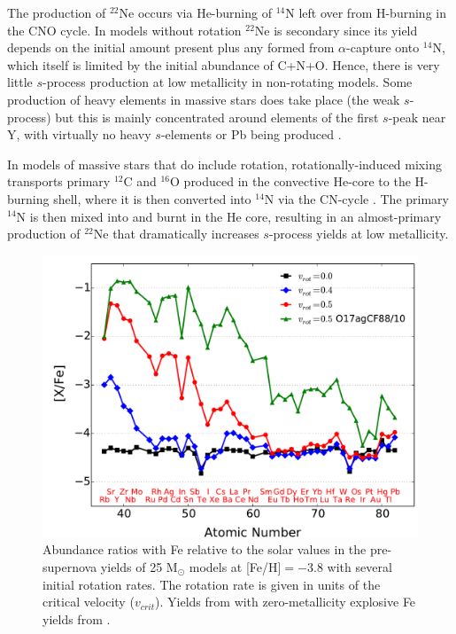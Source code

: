 The production of $^{22}$Ne occurs via He-burning of $^{14}$N left over from H-burning in the CNO cycle. In models without rotation $^{22}$Ne is secondary since its yield depends on the initial amount present plus any formed from $\alpha$-capture onto $^{14}$N, which itself is limited by the initial abundance of C+N+O. Hence, there is very little $s$-process production at low metallicity in non-rotating models. Some production of heavy elements in massive stars does take place (the weak $s$-process) but this is mainly concentrated around elements of the first $s$-peak near Y, with virtually no heavy $s$-elements or Pb being produced \citep{Beer:1992jv,Pignatari:2010ir}.

In models of massive stars that do include rotation, rotationally-induced mixing transports primary $^{12}$C and $^{16}$O produced in the convective He-core to the H-burning shell, where it is then converted into $^{14}$N via the CN-cycle \citep{Meynet:2006bh}. The primary $^{14}$N is then mixed into and burnt in the He core, resulting in an almost-primary production of $^{22}$Ne \citep{Hirschi:2007br} that dramatically increases $s$-process yields at low metallicity.

\begin{figure}
 \begin{center}\includegraphics[width=\textwidth]{f1.pdf}\end{center}
 \caption{Abundance ratios with Fe relative to the solar values in the pre-supernova yields of 25 M$_\odot$ models at [Fe/H]$=-3.8$ with several initial rotation rates. The rotation rate is given in units of the critical velocity ($v_{crit}$). Yields from \citet{Frischknecht:2012il} with zero-metallicity explosive Fe yields from \citet{Limongi:2012ei}.}
 \label{fig:rmsyields}
\end{figure}

